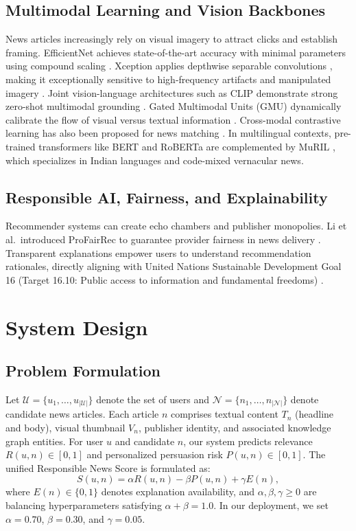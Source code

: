\documentclass[conference]{IEEEtran}
\begin{document}
\subsection{Multimodal Learning and Vision Backbones}
News articles increasingly rely on visual imagery to attract clicks and establish framing. EfficientNet achieves state-of-the-art accuracy with minimal parameters using compound scaling \cite{tan_efficientnet}. Xception applies depthwise separable convolutions \cite{chollet_xception}, making it exceptionally sensitive to high-frequency artifacts and manipulated imagery \cite{rossler_faceforensics,wang_cnngenerated}. Joint vision-language architectures such as CLIP demonstrate strong zero-shot multimodal grounding \cite{radford_clip}. Gated Multimodal Units (GMU) dynamically calibrate the flow of visual versus textual information \cite{arevalo_gmu}. Cross-modal contrastive learning has also been proposed for news matching \cite{liu_multimodal_rec}. In multilingual contexts, pre-trained transformers like BERT \cite{devlin_bert} and RoBERTa \cite{liu_roberta} are complemented by MuRIL \cite{khanuja_muril}, which specializes in Indian languages and code-mixed vernacular news.

\subsection{Responsible AI, Fairness, and Explainability}
Recommender systems can create echo chambers and publisher monopolies. Li et al.\ introduced ProFairRec to guarantee provider fairness in news delivery \cite{li_profai}. Transparent explanations \cite{ribeiro_lime} empower users to understand recommendation rationales, directly aligning with United Nations Sustainable Development Goal 16 (Target 16.10: Public access to information and fundamental freedoms) \cite{sdg}.

\section{System Design}
\subsection{Problem Formulation}
Let $\mathcal{U} = \{u_1, \dots, u_{|\mathcal{U}|}\}$ denote the set of users and $\mathcal{N} = \{n_1, \dots, n_{|\mathcal{N}|}\}$ denote candidate news articles. Each article $n$ comprises textual content $T_n$ (headline and body), visual thumbnail $V_n$, publisher identity, and associated knowledge graph entities. For user $u$ and candidate $n$, our system predicts relevance $R(u,n) \in [0,1]$ and personalized persuasion risk $P(u,n) \in [0,1]$. The unified Responsible News Score is formulated as:
\begin{equation}
S(u,n) = \alpha R(u,n) - \beta P(u,n) + \gamma E(n),
\label{eq:score}
\end{equation}
where $E(n) \in \{0, 1\}$ denotes explanation availability, and $\alpha, \beta, \gamma \ge 0$ are balancing hyperparameters satisfying $\alpha + \beta = 1.0$. In our deployment, we set $\alpha=0.70$, $\beta=0.30$, and $\gamma=0.05$.
\end{document}

